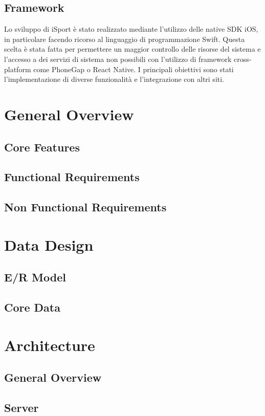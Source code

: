 \documentclass[numbers=noenddot, 12pt, a4paper, oneside]{scrbook}
\begin{document}
\section{Framework}
Lo sviluppo di iSport è stato realizzato mediante l'utilizzo delle native SDK iOS, in particolare facendo ricorso al linguaggio di programmazione Swift. Questa scelta è stata fatta per permettere un maggior controllo delle risorse del sistema e l'accesso a dei servizi di sistema non possibili con l'utilizzo di framework cross-platform come PhoneGap o React Native. I principali obiettivi sono stati l'implementazione di diverse funzionalità e l'integrazione con altri siti.


\chapter{General Overview}
\section{Core Features}
\section{Functional Requirements}
\section{Non Functional Requirements}

\chapter{Data Design}
\section{E/R Model}
\section{Core Data}

\chapter{Architecture}
\section{General Overview}
\section{Server}
\end{document}
